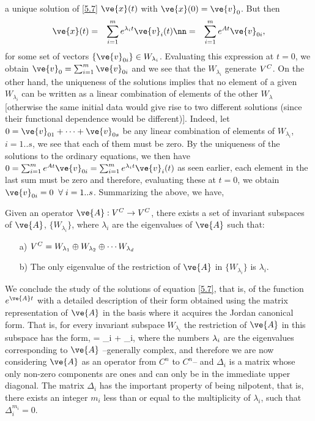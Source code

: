 a unique solution of \ref{5.7} $\ve{x}(t)$ with $\ve{x}(0) = \ve{v}_0$.
But then 
\begin{eqnarray}
  \ve{x}(t) &=& \sum_{i=1}^{m} e^{\lambda_i t} \ve{v}_i(t) \nn
            &=& \sum_{i=1}^{m} e^{A t} \ve{v}_{0i}, 
\end{eqnarray}
for some set of vectors $\{\ve{v}_{0i}\} \in W_{\lambda_i}$.
Evaluating this expression at $t=0$, we obtain
$\ve{v}_0 = \sum_{i=1}^{m} \ve{v}_{0i}$ and we see that the $W_{\lambda_i}$
generate $V^{C}$.
On the other hand, the uniqueness of the solutions implies that no 
element of a given $W_{\lambda_i}$ can be written as
a linear combination of elements of the other $W_{\lambda}$
[otherwise the same initial data would give rise to two
different solutions (since their functional dependence would be
different)]. Indeed, let $0 = \ve{v}_{01}+ \dots + \ve{v}_{0s}$
be any linear combination of elements of $W_{\lambda_i}$, $i=1..s$,
we see that each of them must be zero. By the uniqueness of the solutions
to the ordinary equations, we then have 
$0 = \sum_{i=1}^{m} e^{A t} \ve{v}_{0i} =  \sum_{i=1}^{m} e^{\lambda_i t} \ve{v}_i(t)$
as seen earlier, each element in the last sum must be zero
and therefore, evaluating these at $t=0$, we obtain $\ve{v}_{0i}=0\;\; \forall \; i=1..s$.
Summarizing the above, we have,

\bteo
\label{5_teo_2}
Given an operator $\ve{A}:V^{\Complex} \to V^{\Complex}$, there exists
a set of invariant subspaces of $\ve{A}$, $\{W_{\lambda_i}\}$,
where $ \lambda_i$ are the eigenvalues of $\ve{A}$ such that:
\begin{itemize}
\item[a)] 
$V^{C} = W_{\lambda_1} \oplus W_{\lambda_2}\oplus \cdots W_{\lambda_d}$

\item[b)] 
The only eigenvalue of the restriction of $\ve{A}$ in $\{W_{\lambda_i}\}$
is $ \lambda_i$.
\end{itemize}
\eteo






We conclude the study of the solutions of equation \ref{5.7},
that is, of the function $e^{\ve{A}t}$ with a detailed description
of their form obtained using the matrix representation 
of $\ve{A}$ in the basis
where it acquires the Jordan canonical form.
That is, for every invariant subspace $W_{\lambda_i}$ 
the restriction 
of $\ve{A}$ in this subspace has the form,
\beq
{}= \lap_i + \Delta_i,
\eeq
\noi where the numbers $\mbox{$\lambda$}_i$ are the eigenvalues
corresponding to $\ve{A}$ --generally complex, and therefore we are
now considering $\ve{A}$ as an operator from $C^n$ to $C^n$-- and
$\Delta_i$ is a matrix whose only non-zero components are ones and
can only be in the immediate upper diagonal. The
matrix $\Delta_i$ has the important property of being nilpotent, that is,
there exists an integer $m_i$ less than or equal to the multiplicity of $\lambda_i$, 
such that $\Delta_i^{m_{i}}=0$.

